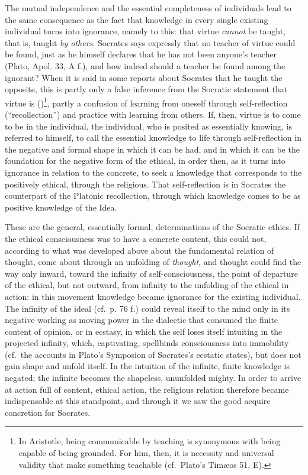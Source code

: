 The mutual independence and the essential
completeness of individuals lead to the same consequence as the fact that knowledge in every single existing individual turns into ignorance, namely to this: that virtue \emph{cannot} be taught, that is, taught
\emph{by others}. Socrates says expressly that no teacher of virtue could
be found, just as he himself declares that he has not
been anyone's teacher (Plato, Apol. 33, A f.), and how indeed should a teacher be found among the ignorant?
When it is said in some reports about Socrates that he
taught the opposite, this is partly only a false inference
from the Socratic statement that virtue is  ()\footnote{In Aristotle, being communicable by teaching is synonymous with
being capable of being grounded. For him, then, it is necessity and
universal validity that make something teachable (cf.\ Plato's Timæos 51, E).}, partly
a confusion of learning from oneself through self-reflection
(``recollection'') and practice with learning from others. If, then,
virtue is to come to be in the individual, the individual, who is posited as essentially knowing, is referred to himself, to call the essential knowledge to life through self-reflection in the negative and
formal shape in which it can be had, and in which it
can be the foundation for the negative form of the ethical, in order then,
as it turns into ignorance in relation to the concrete, to seek a knowledge that corresponds to the positively ethical,
through the religious. That self-reflection is in Socrates
the counterpart of the Platonic recollection, through which
knowledge comes to be as positive knowledge of the Idea.

These are the general, essentially formal,
determinations of the Socratic ethics. If the ethical consciousness was to have a
concrete content, this could not, according to what was developed above about the fundamental relation of thought, come about through an unfolding of \emph{thought}, and thought could find the way only inward, toward
the infinity of self-consciousness, the point of departure of the ethical,
but not outward, from infinity to the unfolding of the ethical in action: in this movement knowledge became ignorance for the existing
individual. The infinity of the ideal (cf.\
p. 76 f.) could reveal itself to the mind only in its negative
working as moving power in the dialectic that consumed
the finite content of opinion, or in ecstasy, in which the self
loses itself intuiting in the projected infinity, which, captivating, spellbinds consciousness into immobility (cf.\ the accounts in Plato's Symposion of Socrates's ecstatic states),
but does not gain shape and unfold itself. In the intuition of
the infinite, finite knowledge is negated; the infinite
becomes the shapeless, ununfolded mighty. In order to arrive at
action full of content, ethical action, the religious relation therefore became indispensable at this standpoint, and through it we saw the
good acquire concretion for Socrates.

